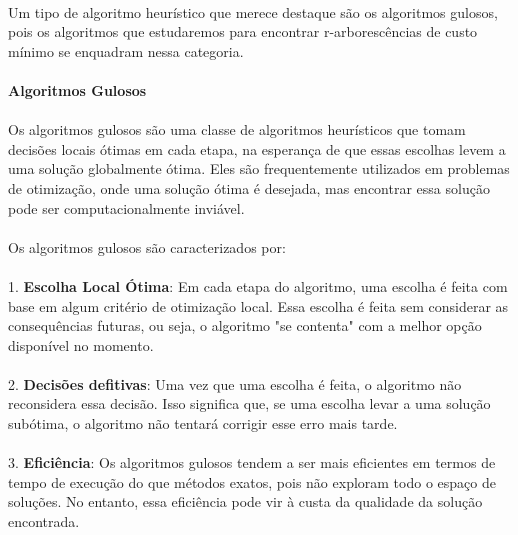 \documentclass[12pt,a4paper]{article}
\def\emph#1{#1}%
\begin{document}
\paragraph{}
Um tipo de algoritmo heurístico que merece destaque são os \emph{algoritmos gulosos}, pois os algoritmos que estudaremos para encontrar r-arborescências de custo mínimo se enquadram nessa categoria.

\paragraph{Algoritmos Gulosos}
\paragraph{}
Os algoritmos gulosos são uma classe de algoritmos heurísticos que tomam decisões locais ótimas em cada etapa, na esperança de que essas escolhas levem a uma solução globalmente ótima. Eles são frequentemente utilizados em problemas de otimização, onde uma solução ótima é desejada, mas encontrar essa solução pode ser computacionalmente inviável.

\paragraph{}
Os algoritmos gulosos são caracterizados por:
\paragraph{}

1. \textbf{Escolha Local Ótima}: Em cada etapa do algoritmo, uma escolha é feita com base em algum critério de otimização local. Essa escolha é feita sem considerar as consequências futuras, ou seja, o algoritmo "se contenta" com a melhor opção disponível no momento.

\paragraph{}
2. \textbf{Decisões defitivas}: Uma vez que uma escolha é feita, o algoritmo não reconsidera essa decisão. Isso significa que, se uma escolha levar a uma solução subótima, o algoritmo não tentará corrigir esse erro mais tarde.

\paragraph{}
3. \textbf{Eficiência}: Os algoritmos gulosos tendem a ser mais eficientes em termos de tempo de execução do que métodos exatos, pois não exploram todo o espaço de soluções. No entanto, essa eficiência pode vir à custa da qualidade da solução encontrada.
\end{document}
